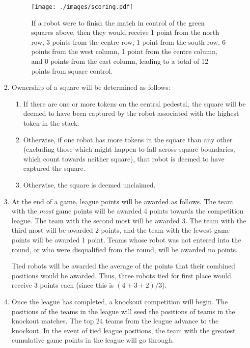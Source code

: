 \begin{enumerate}
  \begin{figure}
    \centering
    \texttt{[image: ./images/scoring.pdf]}
    \caption{If a robot were to finish the match in control of the green squares above, then they would receive 1 point from the north row, 3 points from the centre row, 1 point from the south row, 6 points from the west column, 1 point from the centre column, and 0 points from the east column, leading to a total of 12 points from square control.}
    \label{fig:scoring}
  \end{figure}

\item Ownership of a square will be determined as follows:
\begin{enumerate}
  \item If there are one or more tokens on the central pedestal, the square will be deemed to have been captured by the robot associated with the highest token in the stack.
  \item Otherwise, if one robot has more tokens in the square than any other (excluding those which might happen to fall across square boundaries, which count towards neither square), that robot is deemed to have captured the square.
  \item Otherwise, the square is deemed unclaimed.
\end{enumerate}

\item At the end of a game, league points will be awarded as follows.
      The team with the \emph{most} game points will be awarded 4 points towards the competition league.
      The team with the second most will be awarded 3.
      The team with the third most will be awarded 2 points, and the team with the fewest game points will be awarded 1 point.
      Teams whose robot was not entered into the round, or who were disqualified from the round, will be awarded no points.

      Tied robots will be awarded the average of the points that their combined positions would be awarded.
      Thus, three robots tied for first place would receive 3 points each (since this is $(4+3+2)/3$).

\item Once the league has completed, a knockout competition will begin.
      The positions of the teams in the league will seed the positions of teams in the knockout matches.
      The top 24 teams from the league advance to the knockout.
      In the event of tied league positions, the team with the greatest cumulative game points in the league will go through.


\end{enumerate}
